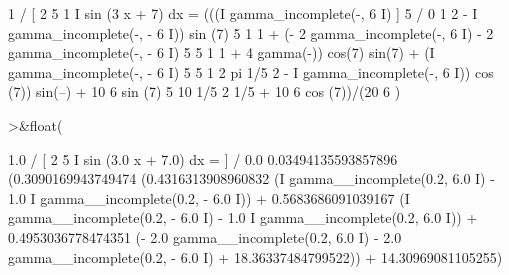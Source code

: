 \documentclass[a4paper,10pt]{article}
\begin{document}
\begin{eulernotebook}
\begin{euleroutput}
            1
           /
           [     2    5                                 1
           I  sin (3 x  + 7) dx = (((I gamma_incomplete(-, 6 I)
           ]                                            5
           /
            0
                        1             2
   - I gamma_incomplete(-, - 6 I)) sin (7)
                        5
                           1                            1
   + (- 2 gamma_incomplete(-, 6 I) - 2 gamma_incomplete(-, - 6 I)
                           5                            5
             1                                       1
   + 4 gamma(-)) cos(7) sin(7) + (I gamma_incomplete(-, - 6 I)
             5                                       5
                        1           2         pi        1/5    2
   - I gamma_incomplete(-, 6 I)) cos (7)) sin(--) + 10 6    sin (7)
                        5                     10
         1/5    2          1/5
   + 10 6    cos (7))/(20 6   )
  
\end{euleroutput}
\begin{eulerprompt}
>&float(%
\end{eulerprompt}
\begin{euleroutput}
  
            1.0
           /
           [       2      5
           I    sin (3.0 x  + 7.0) dx = 
           ]
           /
            0.0
  0.03494135593857896 (0.3090169943749474
   (0.4316313908960832 (I gamma__incomplete(0.2, 6.0 I)
   - 1.0 I gamma__incomplete(0.2, - 6.0 I))
   + 0.5683686091039167 (I gamma__incomplete(0.2, - 6.0 I)
   - 1.0 I gamma__incomplete(0.2, 6.0 I))
   + 0.4953036778474351 (- 2.0 gamma__incomplete(0.2, 6.0 I)
   - 2.0 gamma__incomplete(0.2, - 6.0 I) + 18.36337484799522))
   + 14.30969081105255)
  

\end{euleroutput}
\end{eulernotebook}
\end{document}
